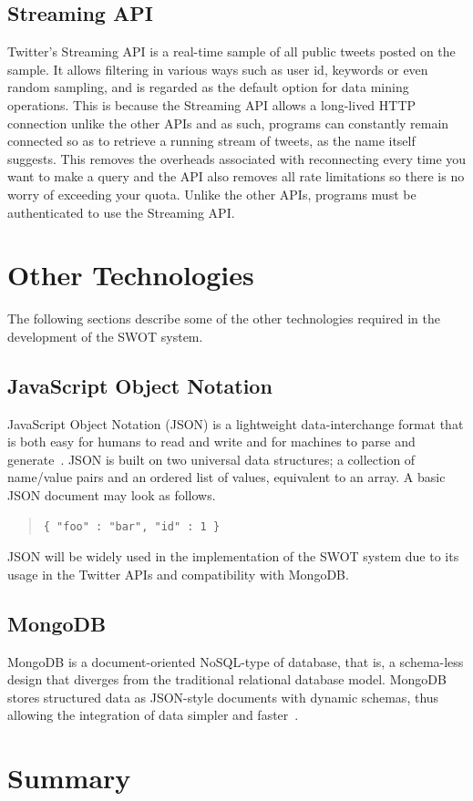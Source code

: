 \subsection{Streaming API}
Twitter's Streaming API is a real-time sample of all public tweets posted on the sample. It allows filtering in various ways such as user id, keywords or even random sampling, and is regarded as the default option for data mining operations. This is because the Streaming API allows a long-lived HTTP connection unlike the other APIs and as such, programs can constantly remain connected so as to retrieve a running stream of tweets, as the name itself suggests. This removes the overheads associated with reconnecting every time you want to make a query and the API also removes all rate limitations so there is no worry of exceeding your quota. Unlike the other APIs, programs must be authenticated to use the Streaming API.

\section{Other Technologies}
The following sections describe some of the other technologies required in the development of the SWOT system.

\subsection{JavaScript Object Notation}
JavaScript Object Notation (JSON) is a lightweight data-interchange format that is both easy for humans to read and write and for machines to parse and generate~\cite{json}. JSON is built on two universal data structures; a collection of name/value pairs and an ordered list of values, equivalent to an array. A basic JSON document may look as follows.

\begin{quote}
\begin{verbatim}
{ "foo" : "bar", "id" : 1 }
\end{verbatim}
\end{quote}

JSON will be widely used in the implementation of the SWOT system due to its usage in the Twitter APIs and compatibility with MongoDB. 

\subsection{MongoDB}
MongoDB is a document-oriented NoSQL-type of database, that is, a schema-less design that diverges from the traditional relational database model. MongoDB stores structured data as JSON-style documents with dynamic schemas, thus allowing the integration of data simpler and faster~\cite{mongodb}.

\section{Summary}


